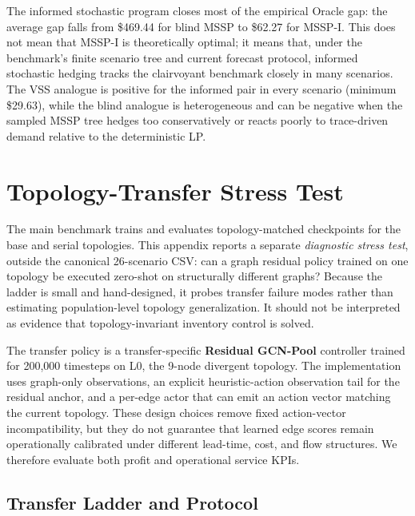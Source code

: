 \documentclass[10pt,a4paper]{article}
\begin{document}
The informed stochastic program closes most of the empirical Oracle gap:
the average gap falls from \$469.44 for blind MSSP to \$62.27 for
MSSP-I. This does not mean that MSSP-I is theoretically optimal; it
means that, under the benchmark's finite scenario tree and current
forecast protocol, informed stochastic hedging tracks the clairvoyant
benchmark closely in many scenarios. The VSS analogue is positive for
the informed pair in every scenario (minimum \$29.63), while the blind
analogue is heterogeneous and can be negative when the sampled MSSP tree
hedges too conservatively or reacts poorly to trace-driven demand
relative to the deterministic LP.

\section{Topology-Transfer Stress Test}%
\label{sec:appendix_transfer}

The main benchmark trains and evaluates topology-matched checkpoints
for the base and serial topologies.  This appendix reports a separate
\emph{diagnostic stress test}, outside the canonical 26-scenario CSV:
can a graph residual policy trained on one topology be executed
zero-shot on structurally different graphs?  Because the ladder is
small and hand-designed, it probes transfer failure modes rather than
estimating population-level topology generalization.  It should not be
interpreted as evidence that topology-invariant inventory control is
solved.

The transfer policy is a transfer-specific \textbf{Residual GCN-Pool}
controller trained for 200{,}000 timesteps on L0, the 9-node divergent
topology.  The implementation uses graph-only observations, an explicit
heuristic-action observation tail for the residual anchor, and a
per-edge actor that can emit an action vector matching the current
topology.  These design choices remove fixed action-vector
incompatibility, but they do not guarantee that learned edge scores
remain operationally calibrated under different lead-time, cost, and
flow structures.  We therefore evaluate both profit and operational
service KPIs.

\subsection{Transfer Ladder and Protocol}
\end{document}
